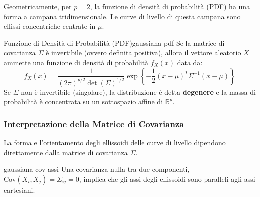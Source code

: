 Geometricamente, per $p=2$, la funzione di densità di probabilità (PDF) ha una
forma a campana tridimensionale. Le curve di livello di questa campana sono
ellissi concentriche centrate in $\mu$.

\begin{proposizione}{Funzione di Densità di Probabilità (PDF)}{gaussiana-pdf}
Se la matrice di covarianza $\Sigma$ è invertibile (ovvero definita positiva),
allora il vettore aleatorio $X$ ammette una funzione di densità di probabilità
$f_X(x)$ data da:
$$
f_X(x) = \frac{1}{(2\pi)^{p/2} \det(\Sigma)^{1/2}}
\exp\left\{-\frac{1}{2}(x-\mu)^T \Sigma^{-1} (x-\mu)\right\}
$$
Se $\Sigma$ non è invertibile (singolare), la distribuzione è detta
\textbf{degenere} e la massa di probabilità è concentrata su un sottospazio
affine di $\mathbb{R}^p$.
\end{proposizione}

\subsubsection*{Interpretazione della Matrice di Covarianza}

La forma e l'orientamento degli ellissoidi delle curve di livello dipendono
direttamente dalla matrice di covarianza $\Sigma$.

\begin{nota}{}{gaussiana-cov-assi}
Una covarianza nulla tra due componenti, $\text{Cov}(X_i, X_j) = \Sigma_{ij} =
0$, implica che gli assi degli ellissoidi sono paralleli agli assi cartesiani.
\end{nota}

